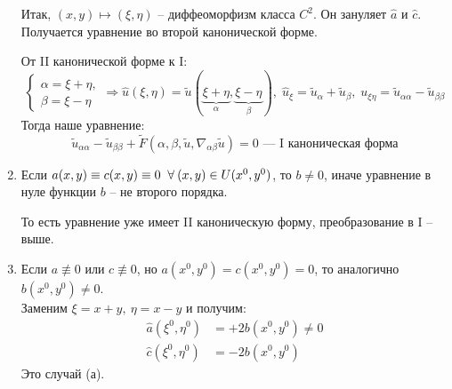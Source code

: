 \documentclass[../main.tex]{subfiles}
\begin{document}
\begin{enumerate}[label=\asbuk*),ref=\asbuk*]
Итак, $(x,y) \mapsto (\xi,\eta)$ -- диффеоморфизм класса $C^2$.
Он зануляет $\hat{a}$ и $\hat{c}$.
Получается уравнение во второй канонической форме.

\begin{remark} 
От II канонической форме к I:
$$
\begin{cases}
  \alpha = \xi + \eta, \\
  \beta  = \xi - \eta
\end{cases} 
\Rightarrow
\hat{u}(\xi, \eta) = \tilde{u}(
    \underbrace{\xi + \eta}_{\alpha},
    \underbrace{\xi - \eta}_{\beta}
  ),\; 
\hat{u}_{\xi} = \tilde{u}_{\alpha} + \tilde{u}_{\beta},\; 
u_{\xi \eta}  = \tilde{u}_{\alpha \alpha} - \tilde{u}_{\beta \beta}
$$
Тогда наше уравнение: 
$$
\tilde{u}_{\alpha \alpha} - \tilde{u}_{\beta \beta} 
+ \tilde{F}(\alpha, \beta, \tilde{u}, \nabla_{\alpha \beta}\tilde{u}) 
= 0
\text{ --- I каноническая форма}
$$
\end{remark}

\item Если $a(x, y) \equiv c(x, y) \equiv 0 
\;\;\forall\: (x, y) \in U(x^0, y^0)$, 
то $b \neq 0$, иначе уравнение в нуле функции $b$ -- не второго порядка.

То есть уравнение уже имеет II каноническую форму, преобразование в I -- выше.

\item Если $a \not\equiv 0$ или $c \not\equiv 0$,
но $a(x^0, y^0) = c(x^0, y^0) = 0$,
то аналогично $b(x^0, y^0) \neq 0$. \\
%
Заменим $\xi = x + y,\ \eta = x - y$ и получим:
\begin{align*}
  \hat{a}(\xi^0, \eta^0) &= +2b(x^0, y^0) \neq 0 \\
  \hat{c}(\xi^0, \eta^0) &= -2b(x^0, y^0)
\end{align*}
Это случай (а).

\end{enumerate}


\end{document}

